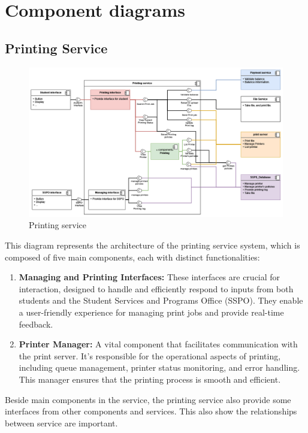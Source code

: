 \section{Component diagrams}
\subsection{Printing Service}
\begin{figure}[H]
\includegraphics[max width = 0.9\linewidth,origin = c]{chapters/6. architecture-design/Component Diagram/printing.png}
  \caption{Printing service}%
  \end{figure}

This diagram represents the architecture of the printing service system, which is composed of five main components, each with distinct functionalities: 
\begin {enumerate}
    \item \textbf{Managing and Printing Interfaces:} These interfaces are crucial for interaction, designed to handle and efficiently respond to inputs from both students and the Student Services and Programs Office (SSPO). They enable a user-friendly experience for managing print jobs and provide real-time feedback.
    \item \textbf{Printer Manager:} A vital component that facilitates communication with the print server. It's responsible for the operational aspects of printing, including queue management, printer status monitoring, and error handling. This manager ensures that the printing process is smooth and efficient.
    
\end{enumerate}
    Beside main components in the service, the printing service also provide some interfaces from other components and services. This also show the relationships between service are important. \\
